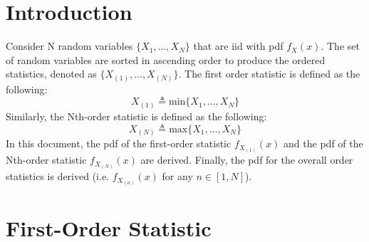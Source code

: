 \documentclass[conference]{IEEEtran}
\begin{document}
\section{Introduction}
Consider N random variables $\{X_1,...,X_N\}$ that are iid with pdf $f_X(x)$. The set of random variables are sorted in ascending order to produce the ordered statistics, denoted as $\{X_{(1)},...,X_{(N)}\}$. The first order statistic is defined as the following:
\begin{equation}
X_{(1)}\triangleq\text{min}\{X_1,...,X_N\}
\end{equation}
Similarly, the Nth-order statistic is defined as the following:
\begin{equation}
X_{(N)}\triangleq\text{max}\{X_1,...,X_N\}
\end{equation}
In this document, the pdf of the first-order statistic $f_{X_{(1)}}(x)$ and the pdf of the Nth-order statistic $f_{X_{(N)}}(x)$ are derived. Finally, the pdf for the overall order statistics is derived (i.e. $f_{X_{(n)}}(x)$ for any $n\in[1,N]$).



%
\section{First-Order Statistic}

\label{First-Order Statistic Section}
\end{document}
